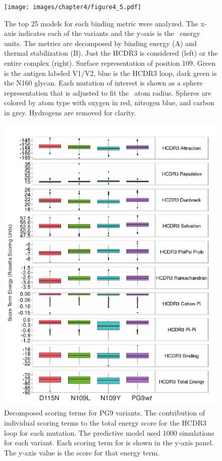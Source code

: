 \begin{figure}[!t]
   \centering
   \texttt{[image: images/chapter4/figure4\_5.pdf]} %
   \caption[Predictive Models of PG9 Variants that Enhanced Binding]{The top 25 models for each binding metric were analyzed. The x-axis indicates each of the variants and the y-axis is the \rosetta~energy units. The metrics are decomposed by binding energy (A) and thermal stabilization (B). Just the HCDR3 is considered (left) or the entire complex (right). Surface representation of position 109. Green is the antigen labeled V1/V2, blue is the HCDR3 loop, dark green is the N160 glycan. Each mutation of interest is shown as a sphere representation that is adjusted to fit the \rosetta~atom radius. Spheres are colored by atom type with oxygen in red, nitrogen blue, and carbon in grey. Hydrogens are removed for clarity.}
   \label{fig:figure4_5}
\end{figure}


\begin{figure}[!t]
   \centering
   \includegraphics[scale=1.4]{images/chapter4/figure4_6.pdf} %
   \caption[Decomposed Scoring Terms for PG9 Variants]{Decomposed scoring terms for PG9 variants. The contribution of individual scoring terms to the total energy score for the HCDR3 loop for each mutation. The predictive model used 1000 simulations for each variant. Each scoring term for \rosetta is shown in the y-axis panel. The y-axis value is the score for that energy term.}
   \label{fig:figure4_6}
\end{figure}


